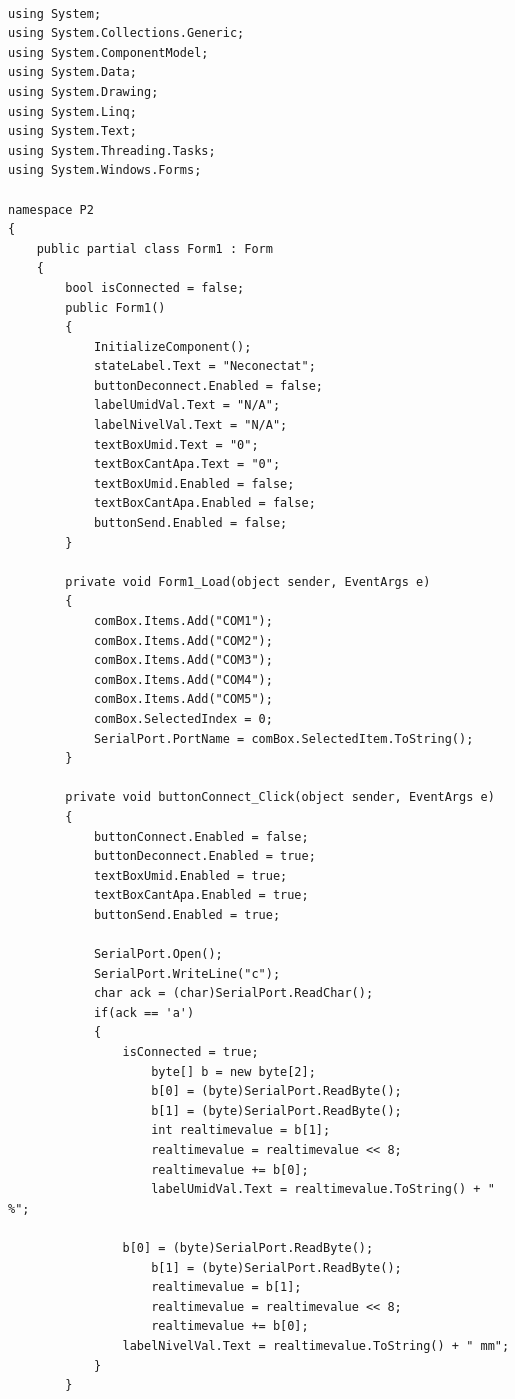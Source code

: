 \documentclass[12pt]{article}
\begin{document}
\begin{lstlisting}[style=CStyle]

using System;
using System.Collections.Generic;
using System.ComponentModel;
using System.Data;
using System.Drawing;
using System.Linq;
using System.Text;
using System.Threading.Tasks;
using System.Windows.Forms;

namespace P2
{
    public partial class Form1 : Form
    {
        bool isConnected = false;
        public Form1()
        {
            InitializeComponent();
            stateLabel.Text = "Neconectat";
            buttonDeconnect.Enabled = false;
            labelUmidVal.Text = "N/A";
            labelNivelVal.Text = "N/A";
            textBoxUmid.Text = "0";
            textBoxCantApa.Text = "0";
            textBoxUmid.Enabled = false;
            textBoxCantApa.Enabled = false;
            buttonSend.Enabled = false;
        }

        private void Form1_Load(object sender, EventArgs e)
        {
            comBox.Items.Add("COM1");
            comBox.Items.Add("COM2");
            comBox.Items.Add("COM3");
            comBox.Items.Add("COM4");
            comBox.Items.Add("COM5");
            comBox.SelectedIndex = 0;
            SerialPort.PortName = comBox.SelectedItem.ToString();
        }

        private void buttonConnect_Click(object sender, EventArgs e)
        {
            buttonConnect.Enabled = false;
            buttonDeconnect.Enabled = true;
            textBoxUmid.Enabled = true;
            textBoxCantApa.Enabled = true;
            buttonSend.Enabled = true;

            SerialPort.Open();
            SerialPort.WriteLine("c");
            char ack = (char)SerialPort.ReadChar();
            if(ack == 'a')
            {
                isConnected = true;
                    byte[] b = new byte[2];
                    b[0] = (byte)SerialPort.ReadByte();
                    b[1] = (byte)SerialPort.ReadByte();
                    int realtimevalue = b[1];
                    realtimevalue = realtimevalue << 8;
                    realtimevalue += b[0];
                    labelUmidVal.Text = realtimevalue.ToString() + " %";

                b[0] = (byte)SerialPort.ReadByte();
                    b[1] = (byte)SerialPort.ReadByte();
                    realtimevalue = b[1];
                    realtimevalue = realtimevalue << 8;
                    realtimevalue += b[0];
                labelNivelVal.Text = realtimevalue.ToString() + " mm";
            }
        }


\end{lstlisting}
\end{document}
